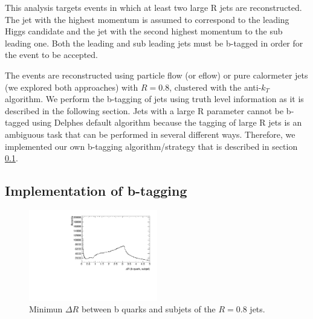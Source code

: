 This analysis targets events in which at least two large R jets are reconstructed. The jet with the highest momentum is assumed to correspond to the leading Higgs candidate and the jet with the second highest momentum to the sub leading one. Both the leading and sub leading jets must be b-tagged in order for the event to be accepted.

The events are reconstructed using particle flow (or eflow) or pure calormeter jets (we explored both approaches) with $R=0.8$, clustered with the anti-$k_T$ algorithm. We perform the b-tagging of jets using truth level information as it is described in the following section. Jets with a large R parameter cannot be b-tagged using Delphes default algorithm because the tagging of large R jets is an ambiguous task that can be performed in several different ways. Therefore, we implemented our own b-tagging algorithm/strategy that is described in section \ref{sec:btagging}. 

\subsection{Implementation of b-tagging}
\label{sec:btagging}

\begin{figure}
	\centering
	\includegraphics[width=0.5\textwidth]{./Figures/deltaR_bsubjet}
	\caption{Minimun $\Delta R$ between b quarks and subjets of the $R=0.8$ jets.} 
	\label{fig:deltaR_bsubjet}
\end{figure}

